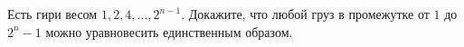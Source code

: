 Есть гири весом $1, 2, 4, \dots, 2^{n - 1}$. Докажите, что любой груз в промежутке от $1$ до $2^n - 1$
можно уравновесить единственным образом.
